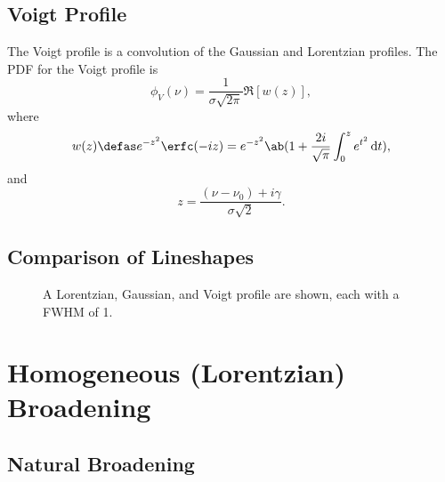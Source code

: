 \subsection{Voigt Profile}

The Voigt profile is a convolution of the Gaussian and Lorentzian profiles.
The PDF for the Voigt profile is
\begin{equation*}
    \phi_V(\nu) = \frac{1}{\sigma\sqrt{2\pi}}\Re[w(z)],
\end{equation*}
where
\begin{equation*}
    w(z) \defas e^{-z^2}\erfc(-iz) = e^{-z^2}\ab(1 + \frac{2i}{\sqrt{\pi}}\int_0^z e^{t^2} \odif{t}),
\end{equation*}
and
\begin{equation*}
    z = \frac{(\nu - \nu_0) + i\gamma}{\sigma\sqrt{2}}.
\end{equation*}

\subsection{Comparison of Lineshapes}

\begin{figure}[H]
    \centering
    \caption{A Lorentzian, Gaussian, and Voigt profile are shown, each with a FWHM of 1.}
\end{figure}

\section{Homogeneous (Lorentzian) Broadening}

\subsection{Natural Broadening}

